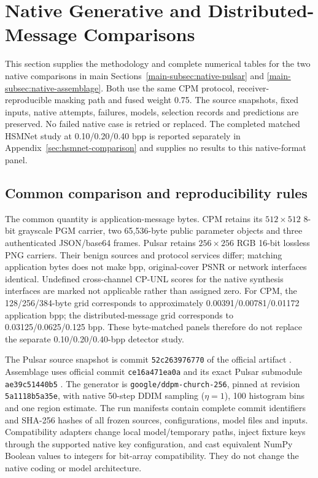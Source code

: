 \documentclass[journal]{IEEEtran}
\theoremstyle{definition}
\theoremstyle{game}
\begin{document}
\clearpage
\section{Native Generative and Distributed-Message Comparisons}
\label{sec:native-comparisons}

This section supplies the methodology and complete numerical tables for
the two native comparisons in main
Sections~\ref{main-subsec:native-pulsar} and
\ref{main-subsec:native-assemblage}. Both use the same CPM
protocol, receiver-reproducible masking path and fused weight 0.75.
The source snapshots, fixed inputs, native attempts, failures, models,
selection records and predictions are preserved. No failed native case
is retried or replaced. The completed matched HSMNet study at
0.10/0.20/0.40 bpp is reported separately in
Appendix~\ref{sec:hsmnet-comparison} and supplies no results to this
native-format panel.

\subsection{Common comparison and reproducibility rules}
\label{subsec:native-repro}
The common quantity is application-message bytes. CPM retains its
$512\times512$ 8-bit grayscale PGM carrier, two 65,536-byte public
parameter objects and three authenticated JSON/base64 frames. Pulsar
retains $256\times256$ RGB 16-bit lossless PNG carriers. Their benign
sources and protocol services differ; matching application bytes does
not make bpp, original-cover PSNR or network interfaces identical.
Undefined cross-channel CP-UNL scores for the native synthesis
interfaces are marked not applicable rather than assigned zero.
For CPM, the 128/256/384-byte grid corresponds to approximately
0.00391/0.00781/0.01172 application bpp; the distributed-message grid
corresponds to 0.03125/0.0625/0.125 bpp. These byte-matched panels
therefore do not replace the separate 0.10/0.20/0.40-bpp detector study.

The Pulsar source snapshot is commit
\texttt{52c263976770} of the official artifact
\cite{Jois2024Pulsar}. Assemblage uses official commit
\texttt{ce16a471ea0a} and its exact Pulsar submodule
\texttt{ae39c51440b5} \cite{Jois2026Assemblage}.
The generator is \texttt{google/ddpm-church-256}, pinned at revision
\texttt{5a1118b5a35e}, with native 50-step DDIM sampling
($\eta=1$), 100 histogram bins and one region estimate.
The run manifests contain complete commit identifiers and SHA-256
hashes of all frozen sources, configurations, model files and inputs.
Compatibility adapters change local model/temporary paths, inject
fixture keys through the supported native key configuration, and cast
equivalent NumPy Boolean values to integers for bit-array compatibility.
They do not change the native coding or model architecture.
\end{document}
